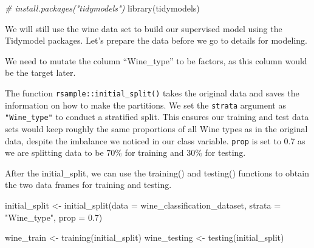 \documentclass[
]{book}
\newenvironment{Shaded}{\begin{snugshade}}{\end{snugshade}}
\newcommand{\AttributeTok}[1]{\textcolor[rgb]{0.77,0.63,0.00}{#1}}
\newcommand{\CommentTok}[1]{\textcolor[rgb]{0.56,0.35,0.01}{\textit{#1}}}
\newcommand{\FloatTok}[1]{\textcolor[rgb]{0.00,0.00,0.81}{#1}}
\newcommand{\FunctionTok}[1]{\textcolor[rgb]{0.00,0.00,0.00}{#1}}
\newcommand{\NormalTok}[1]{#1}
\newcommand{\OtherTok}[1]{\textcolor[rgb]{0.56,0.35,0.01}{#1}}
\newcommand{\SpecialCharTok}[1]{\textcolor[rgb]{0.00,0.00,0.00}{#1}}
\newcommand{\StringTok}[1]{\textcolor[rgb]{0.31,0.60,0.02}{#1}}
\begin{document}
\begin{Shaded}
\begin{Highlighting}[]
\CommentTok{\# install.packages("tidymodels")}
\FunctionTok{library}\NormalTok{(tidymodels)}
\end{Highlighting}
\end{Shaded}

We will still use the wine data set to build our supervised model using the Tidymodel packages. Let's prepare the data before we go to details for modeling.

We need to mutate the column ``Wine\_type'' to be factors, as this column would be the target later.

\begin{Shaded}
\end{Shaded}

The function \texttt{rsample::initial\_split()} takes the original data and saves the information on how to make the partitions. We set the \texttt{strata} argument as \texttt{"Wine\_type"} to conduct a stratified split. This ensures our training and test data sets would keep roughly the same proportions of all Wine types as in the original data, despite the imbalance we noticed in our class variable. \texttt{prop} is set to 0.7 as we are splitting data to be 70\% for training and 30\% for testing.

After the initial\_split, we can use the training() and testing() functions to obtain the two data frames for training and testing.

\begin{Shaded}
\begin{Highlighting}[]
\NormalTok{initial\_split }\OtherTok{\textless{}{-}} \FunctionTok{initial\_split}\NormalTok{(}\AttributeTok{data =}\NormalTok{ wine\_classification\_dataset, }\AttributeTok{strata =} \StringTok{"Wine\_type"}\NormalTok{, }\AttributeTok{prop =} \FloatTok{0.7}\NormalTok{)}

\NormalTok{wine\_train }\OtherTok{\textless{}{-}} \FunctionTok{training}\NormalTok{(initial\_split)}
\NormalTok{wine\_testing }\OtherTok{\textless{}{-}} \FunctionTok{testing}\NormalTok{(initial\_split)}
\end{Highlighting}
\end{Shaded}
\end{document}
